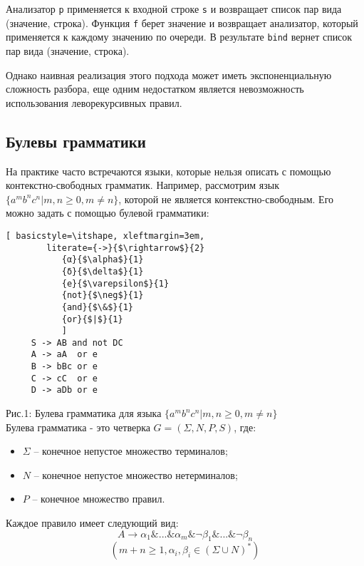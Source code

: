 Анализатор \lstinline[language=Haskell]{p} применяется к входной строке \lstinline[language=Haskell]{s} и возвращает список пар вида (значение, строка). Функция \lstinline[language=Haskell]{f} берет значение и возвращает анализатор, который применяется к каждому значению по очереди. В результате \lstinline[language=Haskell]{bind} вернет список пар вида (значение, строка).
   
Однако наивная реализация этого подхода может иметь экспоненциальную сложность разбора, еще одним недостатком является невозможность использования леворекурсивных правил. %
   
    \subsection{Булевы грамматики}
    
На практике часто встречаются языки,  которые нельзя описать с помощью контекстно-свободных грамматик.
Например, рассмотрим язык $\{a^{m}b^{n}c^{n} |m, n \geq 0, m \neq n\}$, которой не является контекстно-свободным. Его можно задать с помощью булевой грамматики:

\begin{lstlisting}[ basicstyle=\itshape, xleftmargin=3em,
        literate={->}{$\rightarrow$}{2}
           {α}{$\alpha$}{1}
           {δ}{$\delta$}{1}
           {e}{$\varepsilon$}{1}
           {not}{$\neg$}{1}
           {and}{$\&$}{1}
           {or}{$|$}{1}
           ]
     S -> AB and not DC 
     A -> aA  or e
     B -> bBc or e  
     C -> cC  or e  
     D -> aDb or e 
\end{lstlisting}
 Рис.1: Булева грамматика для языка $\{a^{m}b^{n}c^{n} |m, n \geq 0, m \neq n\}$ \\
 
Булева грамматика - это четверка $G = (\Sigma, N, P, S)$, где:
    \begin{itemize}
        \item $\Sigma$ -- конечное непустое множество терминалов;
        \item $N$ -- конечное непустое множество нетерминалов;
        \item $P$ -- конечное множество правил.
    \end{itemize}

Каждое правило имеет следующий вид:
    \[A \rightarrow \alpha_1 \&...\&\alpha_m\&\neg \beta_1 \&...\&\neg \beta_n \]
    \[(m + n \geq 1, \alpha_i, \beta_i \in (\Sigma \cup N)^{*}) \]
    
